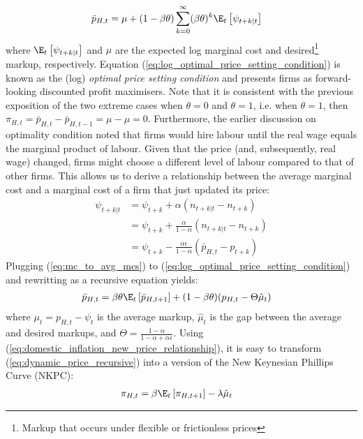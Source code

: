 \begin{align}
\bar{p}_{H,t} &= \mu + (1-\beta \theta) \sum_{k=0}^{\infty} (\beta \theta)^{k} \E_t \left[ \psi_{t+k|t} \right] \label{eq:log_optimal_price_setting_condition}
\end{align}
where $\E_t \left[ \psi_{t+k|t} \right]$ and $\mu$ are the expected log marginal cost and desired\footnote{Markup that occurs under flexible or frictionless prices} markup, respectively. Equation (\ref{eq:log_optimal_price_setting_condition}) is known as the (log) \textit{optimal price setting condition} and presents firms as forward-looking discounted profit maximisers. Note that it is consistent with the previous exposition of the two extreme cases when $\theta = 0$ and $\theta = 1$, i.e. when $\theta = 1$, then $\pi_{H,t} = \bar{p}_{H,t} - \bar{p}_{H,t-1} = \mu - \mu = 0$. Furthermore, the earlier discussion on optimality condition noted that firms would hire labour until the real wage equals the marginal product of labour. Given that the price (and, subsequently, real wage) changed, firms might choose a different level of labour compared to that of other firms. This allows us to derive a relationship between the average marginal cost and a marginal cost of a firm that just updated its price:
\begin{align}
 \psi_{t+k|t} &= \psi_{t+k} + \alpha(n_{t+k|t} - n_{t+k}) \\
 &= \psi_{t+k} + \frac{\alpha}{1-\alpha}(n_{t+k|t} - n_{t+k}) \\
 &=\psi_{t+k} - \frac{\alpha \epsilon}{1-\alpha}(\bar{p}_{H,t} - p_{t+k}) \label{eq:mc_to_avg_mcs}
\end{align}
Plugging (\ref{eq:mc_to_avg_mcs}) to (\ref{eq:log_optimal_price_setting_condition}) and rewritting as a recursive equation yields:
\begin{align}
 \bar{p}_{H,t} &= \beta \theta \E_t \left[ \bar{p}_{H,t+1} \right] + (1-\beta \theta)(p_{H,t} - \Theta \hat{\mu}_t) \label{eq:dynamic_price_recursive}
\end{align}
where $\mu_t = p_{H,t} - \psi_t$ is the average markup, $\hat{\mu}_t$ is the gap between the average and desired markups, and $\Theta = \frac{1-\alpha}{1-\alpha + \alpha \epsilon}$. Using (\ref{eq:domestic_inflation_new_price_relationship}), it is easy to transform (\ref{eq:dynamic_price_recursive}) into a version of the New Keynesian Phillips Curve (NKPC):
\begin{align}
 \pi_{H,t} &= \beta \E_t \left[ \pi_{H,t+1}\right] - \lambda \hat{\mu}_t \label{eq:nkpc_a_version}
\end{align}
